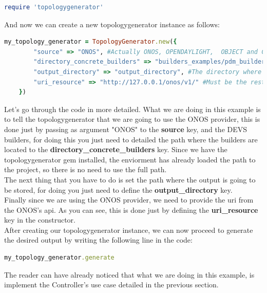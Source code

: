 \begin{lstlisting}[language=Ruby]
require 'topologygenerator'
\end{lstlisting}

And now we can create a new topologygenerator instance as follows:

\begin{lstlisting}[language=Ruby]
my_topology_generator = TopologyGenerator.new({
        "source" => "ONOS", #Actually ONOS, OPENDAYLIGHT,  OBJECT and CUSTOM are the options supported
        "directory_concrete_builders" => "builders_examples/pdm_builders", #The directory where builders are located
        "output_directory" => "output_directory", #The directory where the output will be saved
        "uri_resource" => "http://127.0.0.1/onos/v1/" #Must be the rest api uri if either ONOS or OpenDayLight is choosed or the path of a file if CUSTOM is choosed. In case OBJECT is choosed, you will have to provide a valid instance of Topology.
    })
\end{lstlisting}

Let's go through the code in more detailed. What we are doing in this example is to tell the topologygenerator that we are going to use the ONOS provider, this is done just by passing as argument "ONOS" to the \textbf{source} key, and the DEVS builders, for doing this you just need to detailed the path where the builders are located to the \textbf{directory\_concrete\_builders} key. Since we have the topologygenerator gem installed, the enviorment has already loaded the path to the project, so there is no need to use the full path.\\
The next thing that you have to do is set the path where the output is going to be stored, for doing you just need to define the \textbf{output\_directory} key.\\
Finally since we are using the ONOS provider, we need to provide the uri from the ONOS's api. As you can see, this is done just by defining the \textbf{uri\_resource} key in the constructor. \\

After creating our topologygenerator instance, we can now proceed to generate the desired output by writing the following line in the code:

\begin{lstlisting}[language=Ruby]
my_topology_generator.generate
\end{lstlisting}
 
The reader can have already noticed that what we are doing in this example, is implement the Controller's use case detailed in the previous section.\\

